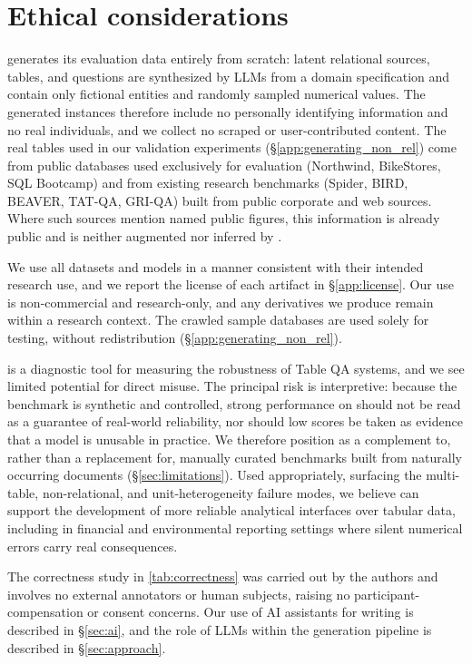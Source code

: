 \section{Ethical considerations}

 \name generates its evaluation data entirely from scratch: latent relational sources, tables, and questions are synthesized by LLMs from a domain specification and contain only fictional entities and randomly sampled numerical values. The generated instances therefore include no personally identifying information and no real individuals, and we collect no scraped or user-contributed content. The real tables used in our validation experiments (\S\ref{app:generating_non_rel}) come from public databases used exclusively for evaluation (Northwind, BikeStores, SQL Bootcamp) and from existing research benchmarks (Spider, BIRD, BEAVER, TAT-QA, GRI-QA) built from public corporate and web sources. Where such sources mention named public figures, this information is already public and is neither augmented nor inferred by \name.

 We use all datasets and models in a manner consistent with their intended research use, and we report the license of each artifact in \S\ref{app:license}. Our use is non-commercial and research-only, and any derivatives we produce remain within a research context. The crawled sample databases are used solely for testing, without redistribution (\S\ref{app:generating_non_rel}).

 \name is a diagnostic tool for measuring the robustness of Table QA systems, and we see limited potential for direct misuse. The principal risk is interpretive: because the benchmark is synthetic and controlled, strong performance on \name should not be read as a guarantee of real-world reliability, nor should low scores be taken as evidence that a model is unusable in practice. We therefore position \name as a complement to, rather than a replacement for, manually curated benchmarks built from naturally occurring documents (\S\ref{sec:limitations}). Used appropriately, surfacing the multi-table, non-relational, and unit-heterogeneity failure modes, we believe \name can support the development of more reliable analytical interfaces over tabular data, including in financial and environmental reporting settings where silent numerical errors carry real consequences.

 The correctness study in \autoref{tab:correctness} was carried out by the authors and involves no external annotators or human subjects, raising no participant-compensation or consent concerns. Our use of AI assistants for writing is described in \S\ref{sec:ai}, and the role of LLMs within the generation pipeline is described in \S\ref{sec:approach}.